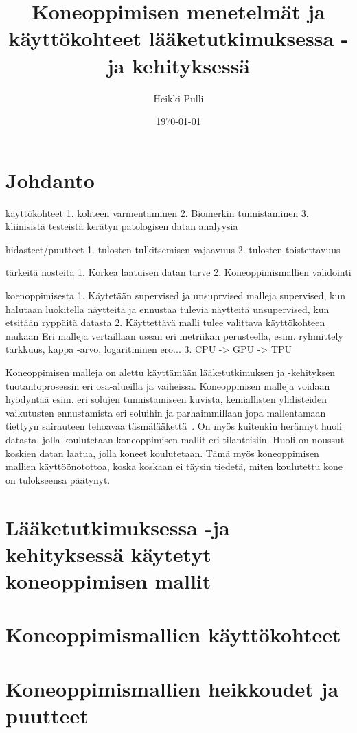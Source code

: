 \documentclass[finnish,twoside,censored,essay,sw-line]{HYthesisML}
\title{Koneoppimisen menetelmät ja käyttökohteet lääketutkimuksessa -ja kehityksessä}
\author{Heikki Pulli}
\date{\today}
\begin{document}
\maketitle

\mytableofcontents
\mainmatter

\chapter{Johdanto}

käyttökohteet
1.  kohteen varmentaminen
2.  Biomerkin tunnistaminen
3.  kliinisistä testeistä kerätyn patologisen datan analyysia

hidasteet/puutteet
1.  tulosten tulkitsemisen vajaavuus
2.  tulosten toistettavuus

tärkeitä nosteita
1.  Korkea laatuisen datan tarve
2.  Koneoppimismallien validointi

koenoppimisesta
1.  Käytetään supervised ja unsuprvised malleja
supervised, kun halutaan luokitella näytteitä ja ennustaa tulevia näytteitä
unsupervised, kun etsitään ryppäitä datasta
2.  Käyttettävä malli tulee valittava käyttökohteen mukaan
Eri malleja vertaillaan usean eri metriikan perusteella, esim. ryhmittely tarkkuus, kappa -arvo,
logaritminen ero...
3. CPU -> GPU -> TPU


Koneoppimisen malleja on alettu käyttämään lääketutkimuksen ja -kehityksen tuotantoprosessin eri osa-alueilla ja vaiheissa. Koneoppmisen malleja voidaan hyödyntää esim. eri
solujen tunnistamiseen kuvista, kemiallisten yhdisteiden vaikutusten ennustamista eri soluihin ja parhaimmillaan jopa mallentamaan tiettyyn sairauteen tehoavaa täsmälääkettä~\cite{vamathevan}.
On myös kuitenkin herännyt huoli datasta, jolla koulutetaan koneoppimisen mallit eri tilanteisiin. Huoli on noussut koskien datan laatua, jolla koneet koulutetaan. Tämä myös
koneoppimisen mallien käyttöönotottoa, koska koskaan ei täysin tiedetä, miten koulutettu kone on tulokseensa päätynyt.

\chapter{Lääketutkimuksessa -ja kehityksessä käytetyt koneoppimisen mallit}

\chapter{Koneoppimismallien käyttökohteet}

\chapter{Koneoppimismallien heikkoudet ja puutteet}

\cleardoublepage
{}
{}
\printbibliography

\backmatter
\end{document}
